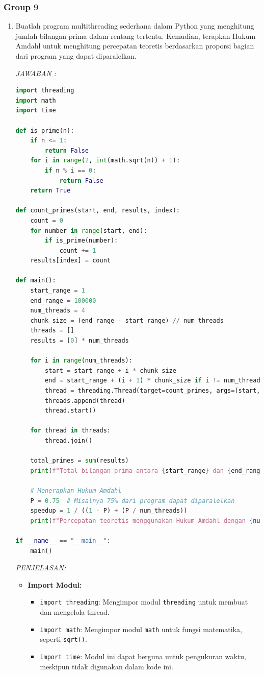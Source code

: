 \documentclass[12pt]{article}
\begin{document}
\subsubsection{Group 9}
\begin{enumerate}
    \item Buatlah program multithreading sederhana dalam Python yang menghitung jumlah bilangan prima dalam rentang tertentu. Kemudian, terapkan Hukum Amdahl untuk menghitung percepatan teoretis berdasarkan proporsi bagian dari program yang dapat diparalelkan.

\textit{JAWABAN : }
\begin{lstlisting}[language=Python, caption={Skenario Multithreading dan Hukum Amdahl}, label={lst:cli_program}, basicstyle=\ttfamily\small, keywordstyle=\color{blue}, commentstyle=\color{gray}]
import threading
import math
import time

def is_prime(n):
    if n <= 1:
        return False
    for i in range(2, int(math.sqrt(n)) + 1):
        if n % i == 0:
            return False
    return True

def count_primes(start, end, results, index):
    count = 0
    for number in range(start, end):
        if is_prime(number):
            count += 1
    results[index] = count

def main():
    start_range = 1
    end_range = 100000
    num_threads = 4
    chunk_size = (end_range - start_range) // num_threads
    threads = []
    results = [0] * num_threads

    for i in range(num_threads):
        start = start_range + i * chunk_size
        end = start_range + (i + 1) * chunk_size if i != num_threads - 1 else end_range
        thread = threading.Thread(target=count_primes, args=(start, end, results, i))
        threads.append(thread)
        thread.start()

    for thread in threads:
        thread.join()

    total_primes = sum(results)
    print(f"Total bilangan prima antara {start_range} dan {end_range} adalah: {total_primes}")

    # Menerapkan Hukum Amdahl
    P = 0.75  # Misalnya 75% dari program dapat diparalelkan
    speedup = 1 / ((1 - P) + (P / num_threads))
    print(f"Percepatan teoretis menggunakan Hukum Amdahl dengan {num_threads} thread: {speedup}")

if __name__ == "__main__":
    main()
\end{lstlisting}
\textit{PENJELASAN: }
\begin{itemize}
    \item \textbf{Import Modul:}
    \begin{itemize}
        \item \texttt{import threading}: Mengimpor modul \texttt{threading} untuk membuat dan mengelola thread.
        \item \texttt{import math}: Mengimpor modul \texttt{math} untuk fungsi matematika, seperti \texttt{sqrt()}.
        \item \texttt{import time}: Modul ini dapat berguna untuk pengukuran waktu, meskipun tidak digunakan dalam kode ini.
    \end{itemize}


\end{itemize}
\end{enumerate}
\end{document}
